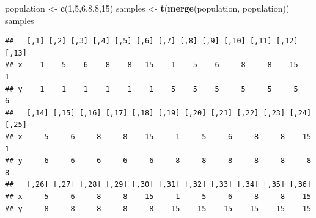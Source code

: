 \documentclass[]{article}
\newenvironment{Shaded}{\begin{snugshade}}{\end{snugshade}}
\newcommand{\KeywordTok}[1]{\textcolor[rgb]{0.13,0.29,0.53}{\textbf{#1}}}
\newcommand{\DataTypeTok}[1]{\textcolor[rgb]{0.13,0.29,0.53}{#1}}
\newcommand{\DecValTok}[1]{\textcolor[rgb]{0.00,0.00,0.81}{#1}}
\newcommand{\StringTok}[1]{\textcolor[rgb]{0.31,0.60,0.02}{#1}}
\newcommand{\OperatorTok}[1]{\textcolor[rgb]{0.81,0.36,0.00}{\textbf{#1}}}
\newcommand{\NormalTok}[1]{#1}
\begin{document}
\begin{Shaded}
\begin{Highlighting}[]
\NormalTok{population <-}\StringTok{ }\KeywordTok{c}\NormalTok{(}\DecValTok{1}\NormalTok{,}\DecValTok{5}\NormalTok{,}\DecValTok{6}\NormalTok{,}\DecValTok{8}\NormalTok{,}\DecValTok{8}\NormalTok{,}\DecValTok{15}\NormalTok{)}
\NormalTok{samples <-}\StringTok{ }\KeywordTok{t}\NormalTok{(}\KeywordTok{merge}\NormalTok{(population, population))}
\NormalTok{samples}
\end{Highlighting}
\end{Shaded}

\begin{verbatim}
##   [,1] [,2] [,3] [,4] [,5] [,6] [,7] [,8] [,9] [,10] [,11] [,12] [,13]
## x    1    5    6    8    8   15    1    5    6     8     8    15     1
## y    1    1    1    1    1    1    5    5    5     5     5     5     6
##   [,14] [,15] [,16] [,17] [,18] [,19] [,20] [,21] [,22] [,23] [,24] [,25]
## x     5     6     8     8    15     1     5     6     8     8    15     1
## y     6     6     6     6     6     8     8     8     8     8     8     8
##   [,26] [,27] [,28] [,29] [,30] [,31] [,32] [,33] [,34] [,35] [,36]
## x     5     6     8     8    15     1     5     6     8     8    15
## y     8     8     8     8     8    15    15    15    15    15    15
\end{verbatim}

\begin{Shaded}
\end{Shaded}
\end{document}
